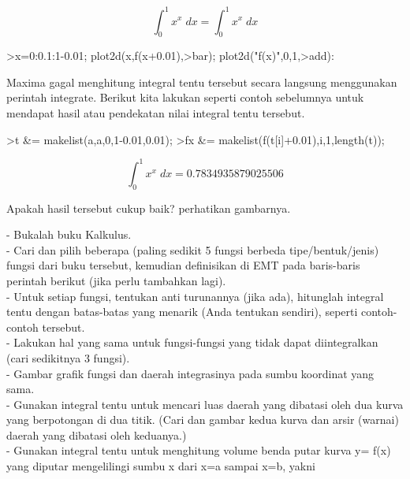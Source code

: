 \documentclass{article}
\begin{document}
\begin{eulernotebook}
\begin{eulercomment}
\begin{eulercomment}
\begin{euleroutput}
\end{euleroutput}
\begin{eulerformula}
\[
\int_{0}^{1}{x^{x}\;dx}=\int_{0}^{1}{x^{x}\;dx}
\]
\end{eulerformula}
\begin{eulerprompt}
>x=0:0.1:1-0.01; plot2d(x,f(x+0.01),>bar); plot2d("f(x)",0,1,>add):
\end{eulerprompt}
\begin{eulercomment}
Maxima gagal menghitung integral tentu tersebut secara langsung menggunakan perintah
integrate. Berikut kita lakukan seperti contoh sebelumnya untuk mendapat hasil atau
pendekatan nilai integral tentu tersebut.
\end{eulercomment}
\begin{eulerprompt}
>t &= makelist(a,a,0,1-0.01,0.01);
>fx &= makelist(f(t[i]+0.01),i,1,length(t));
\end{eulerprompt}
\begin{eulerformula}
\[
\int_{0}^{1}{x^{x}\;dx}=0.7834935879025506
\]
\end{eulerformula}
\begin{eulercomment}
Apakah hasil tersebut cukup baik? perhatikan gambarnya.
\end{eulercomment}
\begin{eulercomment}
- Bukalah buku Kalkulus.\\
- Cari dan pilih beberapa (paling sedikit 5 fungsi berbeda
tipe/bentuk/jenis) fungsi dari buku tersebut, kemudian definisikan di
EMT pada baris-baris perintah berikut (jika perlu tambahkan lagi).\\
- Untuk setiap fungsi, tentukan anti turunannya (jika ada), hitunglah
integral tentu dengan batas-batas yang menarik (Anda tentukan
sendiri), seperti contoh-contoh tersebut.\\
- Lakukan hal yang sama untuk fungsi-fungsi yang tidak dapat
diintegralkan (cari sedikitnya 3 fungsi).\\
- Gambar grafik fungsi dan daerah integrasinya pada sumbu koordinat
yang sama.\\
- Gunakan integral tentu untuk mencari luas daerah yang dibatasi oleh
dua kurva yang berpotongan di dua titik. (Cari dan gambar kedua kurva
dan arsir (warnai) daerah yang dibatasi oleh keduanya.)\\
- Gunakan integral tentu untuk menghitung volume benda putar kurva y=
f(x) yang diputar mengelilingi sumbu x dari x=a sampai x=b, yakni


\end{eulercomment}
\end{eulercomment}
\end{eulercomment}
\end{eulernotebook}
\end{document}
